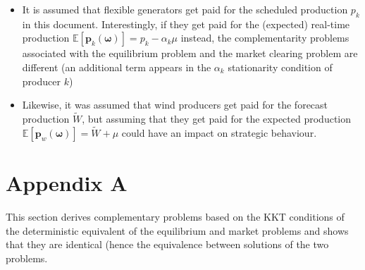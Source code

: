 \documentclass{article}
\begin{document}
\begin{itemize} 
\item It is assumed that flexible generators get paid for the scheduled production $p_k$ in this document. Interestingly, if they get paid for the (expected) real-time production $\mathbb{E}[\mathbf{p}_k(\boldsymbol{\omega})] = p_k - \alpha_k \mu$ instead, the complementarity problems associated with the equilibrium problem and the market clearing problem are different (an additional term  appears in the $\alpha_k$ stationarity condition of producer $k$)
\item Likewise, it was assumed that wind producers get paid for the forecast production $\tilde{W}$, but assuming that they get paid for the expected production $\mathbb{E}[\mathbf{p}_w(\boldsymbol{\omega})] = \tilde{W} + \mu$ could have an impact on strategic behaviour.
\end{itemize}

\section*{Appendix A}
This section derives complementary problems based on the KKT conditions of the deterministic equivalent of the equilibrium and market problems and shows that they are identical (hence the equivalence between solutions of the two problems.
\end{document}
